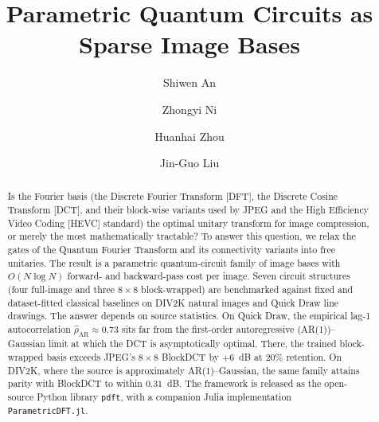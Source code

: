 \documentclass[a4paper, twocolumn]{quantumarticle}
\begin{document}
\title{Parametric Quantum Circuits as Sparse Image Bases}

\author{Shiwen An}
\author{Zhongyi Ni}
\author{Huanhai Zhou}
\author{Jin-Guo Liu}

\maketitle

\begin{abstract}
Is the Fourier basis (the Discrete Fourier Transform [DFT], the Discrete Cosine Transform [DCT], and their block-wise variants used by JPEG and the High Efficiency Video Coding [HEVC] standard) the optimal unitary transform for image compression, or merely the most mathematically tractable? To answer this question, we relax the gates of the Quantum Fourier Transform and its connectivity variants into free unitaries. The result is a parametric quantum-circuit family of image bases with $O(N \log N)$ forward- and backward-pass cost per image. Seven circuit structures (four full-image and three $8 \times 8$ block-wrapped) are benchmarked against fixed and dataset-fitted classical baselines on DIV2K natural images and Quick Draw line drawings. The answer depends on source statistics. On Quick Draw, the empirical lag-1 autocorrelation $\hat{\rho}_{\mathrm{AR}} \approx 0.73$ sits far from the first-order autoregressive (AR(1))--Gaussian limit at which the DCT is asymptotically optimal. There, the trained block-wrapped basis exceeds JPEG's $8 \times 8$ BlockDCT by $+6$~dB at $20\%$ retention. On DIV2K, where the source is approximately AR(1)--Gaussian, the same family attains parity with BlockDCT to within $0.31$~dB. The framework is released as the open-source Python library \texttt{pdft}, with a companion Julia implementation \texttt{ParametricDFT.jl}.
\end{abstract}
\end{document}
